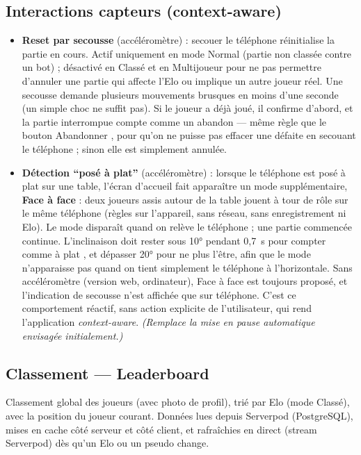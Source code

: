\documentclass[a4paper,11pt]{article}
\begin{document}
\subsection{Interactions capteurs (context-aware)}
\begin{itemize}[leftmargin=1.5em]
  \item \textbf{Reset par secousse} (accéléromètre) : secouer le téléphone
        réinitialise la partie en cours. Actif uniquement en mode Normal (partie
        non classée contre un bot) ; désactivé en Classé et en Multijoueur pour ne
        pas permettre d'annuler une partie qui affecte l'Elo ou implique un autre
        joueur réel. Une secousse demande plusieurs mouvements brusques en
        moins d'une seconde (un simple choc ne suffit pas). Si le joueur a
        déjà joué, il confirme d'abord, et la partie interrompue compte comme
        un abandon --- même règle que le bouton \og Abandonner \fg{}, pour
        qu'on ne puisse pas effacer une défaite en secouant le téléphone ;
        sinon elle est simplement annulée.
  \item \textbf{Détection ``posé à plat''} (accéléromètre) : lorsque le
        téléphone est posé à plat sur une table, l'écran d'accueil fait
        apparaître un mode supplémentaire, \textbf{Face à face} : deux joueurs
        assis autour de la table jouent à tour de rôle sur le même téléphone
        (règles sur l'appareil, sans réseau, sans enregistrement ni Elo). Le
        mode disparaît quand on relève le téléphone ; une partie commencée
        continue. L'inclinaison doit rester sous 10° pendant 0,7~s pour
        compter comme \og à plat \fg{}, et dépasser 20° pour ne plus l'être,
        afin que le mode n'apparaisse pas quand on tient simplement le
        téléphone à l'horizontale. Sans accéléromètre (version web,
        ordinateur), Face à face est toujours proposé, et l'indication de
        secousse n'est affichée que sur téléphone. C'est ce comportement réactif, sans action
        explicite de l'utilisateur, qui rend l'application
        \textit{context-aware}. \textit{(Remplace la mise en pause automatique
        envisagée initialement.)}
\end{itemize}

\subsection{Classement --- Leaderboard}
Classement global des joueurs (avec photo de profil), trié par Elo (mode Classé), avec
la position du joueur courant. Données lues depuis Serverpod (PostgreSQL), mises en
cache côté serveur et côté client, et rafraîchies en direct (stream Serverpod) dès
qu'un Elo ou un pseudo change.
\end{document}
